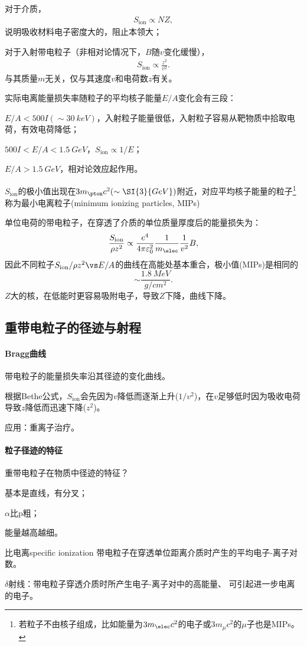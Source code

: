 对于介质，
\begin{align}
	S_{\mathrm{ion}}\propto NZ,
\end{align}
说明吸收材料电子密度大的，阻止本领大；

对于入射带电粒子（非相对论情况下，$B$随$v$变化缓慢），
\begin{align}
	S_{\mathrm{ion}}\propto\frac{z^2}{v^2}.
\end{align}
与其质量$m$无关，仅与其速度$v$和电荷数$z$有关。

实际电离能量损失率随粒子的平均核子能量$E/A$变化会有三段：
\begin{compactenum}
	\item $E/A<500I(\sim\SI{30}{keV})$，入射粒子能量很低，入射粒子容易从靶物质中拾取电荷，有效电荷降低；
	\item $500I<E/A<\SI{1.5}{GeV}$，$S_{\mathrm{ion}}\propto1/E$；
	\item $E/A>\SI{1.5}{GeV}$，相对论效应起作用。
\end{compactenum}
$S_{\mathrm{ion}}$的极小值出现在$3m_\pton c^2(\sim\SI{3}{GeV})$附近，对应平均核子能量的粒子\footnote{若粒子不由核子组成，比如能量为$3m_\elec c^2$的电子或$3m_\mu c^2$的$\mu$子也是MIPs。}称为最小电离粒子(minimum ionizing particles, MIPs)

单位电荷的带电粒子，在穿透了介质的单位质量厚度后的能量损失为：
\[
	\frac{S_{\mathrm{ion}}}{\rho z^2}\propto\frac{e^4}{4\pi\varepsilon_0^2}\frac{1}{m_\elec}\frac{1}{v^2}B,
\]
因此不同粒子$S_{\mathrm{ion}}/\rho z^2\vs E/A$的曲线在高能处基本重合，极小值(MIPs)是相同的
\[
	\sim\frac{\SI{1.8}{MeV}}{\si{g/cm^2}}.
\]
$Z$大的核，在低能时更容易吸附电子，导致$Z$下降，曲线下降。

\subsection{重带电粒子的径迹与射程}

\paragraph{Bragg曲线}带电粒子的能量损失率沿其径迹的变化曲线。

根据Bethe公式，$S_{\mathrm{ion}}$会先因为$v$降低而逐渐上升($1/v^2$)，在$v$足够低时因为吸收电荷导致$z$降低而迅速下降($z^2$)。

应用：重离子治疗。
\paragraph{粒子径迹的特征}重带电粒子在物质中径迹的特征？
\begin{compactenum}
	\item 基本是直线，有分叉；
	\item $\alpha$比p粗；
	\item 能量越高越细。
\end{compactenum}
\begin{definition}{比电离}{specific ionization}
	带电粒子在穿透单位距离介质时产生的平均电子-离子对数。
\end{definition}
$\delta$射线：带电粒子穿透介质时所产生电子-离子对中的高能量、 可引起进一步电离的电子。
